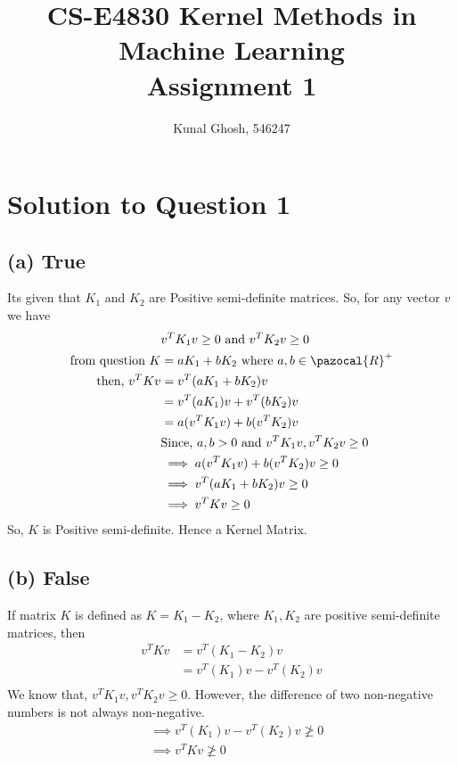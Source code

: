 \documentclass[a4paper,11pt]{article}
\begin{document}
\title{CS-E4830 Kernel Methods in Machine Learning \\ Assignment 1} %
\author{Kunal Ghosh, 546247} %
\maketitle
\section{Solution to Question 1}
\subsection{(a) True}
Its given that $K_1$ and $K_2$ are Positive semi-definite matrices. So, for any vector $v$ we have
\begin{equation}
    \begin{split}
        & v^{T}K_1v \ge 0 \text{ and } v^{T}K_2v \ge 0\\
        \text{from question } K & = aK_1 + bK_2 \text{ where } a,b \in \pazocal{R}^+ \\ 
        \text{then, } v^TKv &= v^T (aK_1 + bK_2) v \\
        & = v^T (aK_1) v + v^T (bK_2) v \\
        & = a (v^TK_1v) + b (v^TK_2)v \\
        & \text{Since, } a,b > 0 \text{ and } v^TK_1v, v^TK_2v \ge 0\\
        & \implies a (v^TK_1v) + b (v^TK_2)v \ge 0 \\
        & \implies  v^T (aK_1 + bK_2) v \ge 0 \\
        & \implies v^TKv \ge 0 \\
    \end{split}
\end{equation}
So, $K$ is Positive semi-definite. Hence a Kernel Matrix.
\subsection{(b) False}
If matrix $K$ is defined as ${K = K_1 - K_2}$, where ${K_1 , K_2}$ are positive semi-definite matrices, then
\begin{equation}
    \begin{split}
        v^TKv &= v^T(K_1 - K_2)v \\
        &= v^T(K_1)v - v^T(K_2)v \\
    \end{split}
\end{equation}
We know that, ${ v^TK_1v, v^TK_2v \ge 0 }$. However, the difference of two non-negative numbers is not always non-negative.
\begin{equation}
    \begin{split}
        & \implies v^T(K_1)v - v^T(K_2)v \ngeq 0 \\
        & \implies v^TKv \ngeq 0 \\
    \end{split}
\end{equation}
\end{document}
